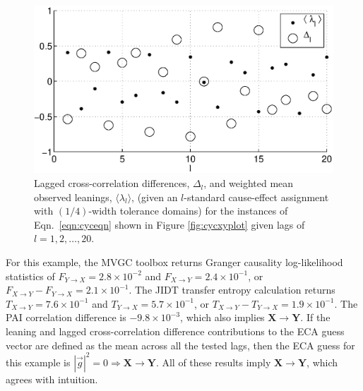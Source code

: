 \documentclass{article}[10pt]
\begin{document}
\begin{figure}[ht]
\begin{center}
\includegraphics[scale=0.7]{NoisyCyclicResponseExample_LandLCC.eps} 
\end{center}
\caption{Lagged cross-correlation differences, $\Delta_l$, and weighted mean observed leanings, $\langle\lambda_l\rangle$, (given an $l$-standard cause-effect assignment with $(1/4)$-width tolerance domains) for the instances of Eqn.\ \ref{eqn:cyceqn} shown in Figure \ref{fig:cycxyplot} given lags of $l=1,2,\ldots,20$.}
\label{fig:cycxyLandLCC}
\end{figure}

For this example, the MVGC toolbox returns Granger causality log-likelihood statistics of $F_{Y\rightarrow X}=2.8\times 10^{-2}$ and $F_{X\rightarrow Y}=2.4\times 10^{-1}$, or $F_{X\rightarrow Y}-F_{Y\rightarrow X}=2.1\times 10^{-1}$.  The JIDT transfer entropy calculation returns $T_{X\rightarrow Y}=7.6\times 10^{-1}$ and $T_{Y\rightarrow X}=5.7\times 10^{-1}$, or $T_{X\rightarrow Y}-T_{Y\rightarrow X}=1.9\times 10^{-1}$.  The PAI correlation difference is $-9.8\times 10^{-3}$, which also implies $\mathbf{X}\rightarrow\mathbf{Y}$.  If the leaning and lagged cross-correlation difference contributions to the ECA guess vector are defined as the mean across all the tested lags, then the ECA guess for this example is $|\vec{g}|^2=0\Rightarrow \mathbf{X}\rightarrow\mathbf{Y}$.  All of these results imply $\mathbf{X}\rightarrow\mathbf{Y}$, which agrees with intuition.    
\end{document}
